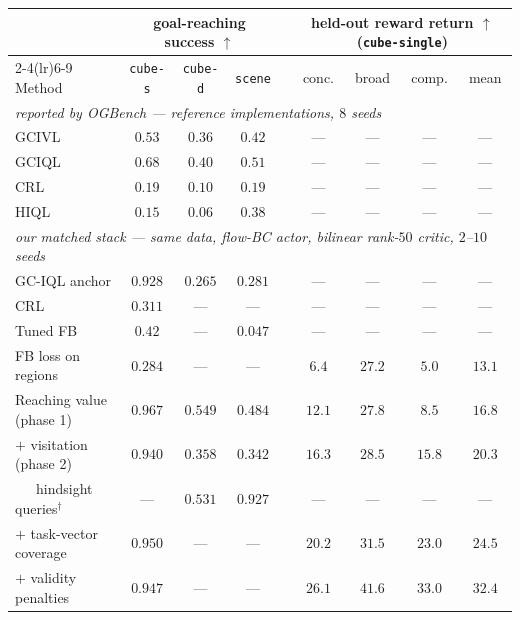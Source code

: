 \documentclass{article}
\begin{document}
\begin{table}[t]
\centering\small
\setlength{\tabcolsep}{4.2pt}
\begin{tabular}{l ccc c cccc}
\toprule
& \multicolumn{3}{c}{goal-reaching success $\uparrow$} &
& \multicolumn{4}{c}{held-out reward return $\uparrow$ (\texttt{cube-single})} \\
\cmidrule(lr){2-4}\cmidrule(lr){6-9}
Method & \texttt{cube-s} & \texttt{cube-d} & \texttt{scene} &
& conc. & broad & comp. & mean \\
\midrule
\multicolumn{9}{l}{\emph{reported by OGBench \citep{park2024ogbench} ---
reference implementations, $8$ seeds}} \\
GCIVL  & $0.53$ & $0.36$ & $0.42$ & & --- & --- & --- & --- \\
GCIQL  & $0.68$ & $0.40$ & $0.51$ & & --- & --- & --- & --- \\
CRL    & $0.19$ & $0.10$ & $0.19$ & & --- & --- & --- & --- \\
HIQL   & $0.15$ & $0.06$ & $0.38$ & & --- & --- & --- & --- \\
\midrule
\multicolumn{9}{l}{\emph{our matched stack --- same data, flow-BC actor,
bilinear rank-$50$ critic, $2$--$10$ seeds}} \\
GC-IQL anchor            & $0.928$ & $0.265$ & $0.281$ & & --- & --- & --- & --- \\
CRL                      & $0.311$ & ---     & ---     & & --- & --- & --- & --- \\
Tuned FB                 & $0.42$  & ---     & $0.047$ & & --- & --- & --- & --- \\
FB loss on regions       & $0.284$ & ---     & ---     & & $6.4$ & $27.2$ & $5.0$ & $13.1$ \\
\midrule
Reaching value (phase 1) & $\mathbf{0.967}$ & $\mathbf{0.549}$ & $0.484$ &
                           & $12.1$ & $27.8$ & $8.5$  & $16.8$ \\
$+$ visitation (phase 2) & $0.940$ & $0.358$ & $0.342$ & & $16.3$ & $28.5$ & $15.8$ & $20.3$ \\
\ \ \ hindsight queries$^\dagger$ & --- & $0.531$ & $\mathbf{0.927}$ & & --- & --- & --- & --- \\
$+$ task-vector coverage & $0.950$ & ---     & ---     & & $20.2$ & $31.5$ & $23.0$ & $24.5$ \\
$+$ validity penalties   & $0.947$ & ---     & ---     & & $\mathbf{26.1}$ & $\mathbf{41.6}$ & $\mathbf{33.0}$ & $\mathbf{32.4}$ \\
\bottomrule
\end{tabular}

\end{table}
\end{document}
